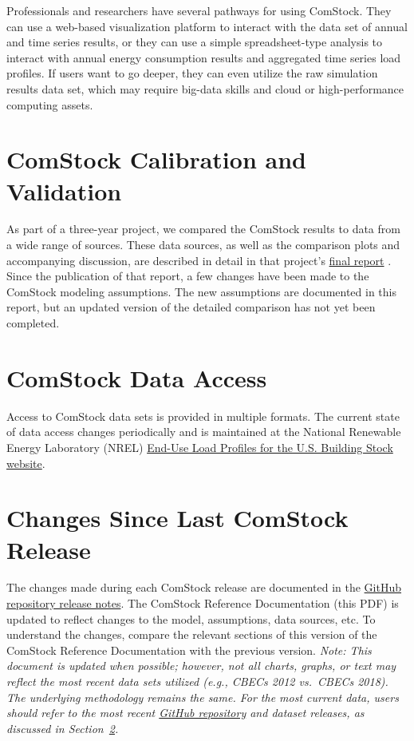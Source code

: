 Professionals and researchers have several pathways for using ComStock. They can use a web-based visualization platform to interact with the data set of annual and time series results, or they can use a simple spreadsheet-type analysis to interact with annual energy consumption results and aggregated time series load profiles. If users want to go deeper, they can even utilize the raw simulation results data set, which may require big-data skills and cloud or high-performance computing assets.

\section{ComStock Calibration and Validation}
As part of a three-year project, we compared the ComStock results to data from a wide range of sources. These data sources, as well as the comparison plots and accompanying discussion, are described in detail in that project's \href{https://www.nrel.gov/docs/fy22osti/80889.pdf}{final report} \citep{eulp_final_report}. Since the publication of that report, a few changes have been made to the ComStock modeling assumptions. The new assumptions are documented in this report, but an updated version of the detailed comparison has not yet been completed.

\section{ComStock Data Access}
\label{sec:comstock_data_access}
Access to ComStock data sets is provided in multiple formats. The current state of data access changes periodically and is maintained at the National Renewable Energy Laboratory (NREL) \href{https://www.nrel.gov/buildings/end-use-load-profiles.html}{End-Use Load Profiles for the U.S. Building Stock website}.

\section{Changes Since Last ComStock Release}
The changes made during each ComStock release are documented in the \href{https://github.com/NREL/ComStock/releases}{GitHub repository release notes}. The ComStock Reference Documentation (this PDF) is updated to reflect changes to the model, assumptions, data sources, etc. To understand the changes, compare the relevant sections of this version of the ComStock Reference Documentation with the previous version. \textit{Note: This document is updated when possible; however, not all charts, graphs, or text may reflect the most recent data sets utilized (e.g., CBECs 2012 vs.\ CBECs 2018). The underlying methodology remains the same. For the most current data, users should refer to the most recent \href{https://github.com/NREL/ComStock}{GitHub repository} and dataset releases, as discussed in Section~\ref{sec:comstock_data_access}.}
